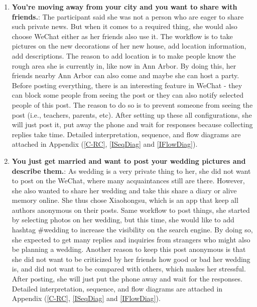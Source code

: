 \documentclass[acmsmall,screen,authorversion,nonacm]{acmart}
\begin{document}
\begin{center}
\begin{enumerate}
    \item \textbf{You’re moving away from your city and you want to share with friends.}: The participant said she was not a person who are eager to share such private news. But when it comes to a required thing, she would also choose WeChat either as her friends also use it. The workflow is to take pictures on the new decorations of her new house, add location information, add descriptions. The reason to add location is to make people know the rough area she is currently in, like now in Ann Arbor. By doing this, her friends nearby Ann Arbor can also come and maybe she can host a party. Before posting everything, there is an interesting feature in WeChat - they can block some people from seeing the post or they can also notify selected people of this post. The reason to do so is to prevent someone from seeing the post (i.e., teachers, parents, etc). After setting up these all configurations, she will just post it, put away the phone and wait for responses because collecting replies take time. Detailed interpretation, sequence, and flow diagrams are attached in Appendix (\ref{C-RC}, \ref{ISeqDiag} and \ref{IFlowDiag}). 

    \item \textbf{You just get married and want to post your wedding pictures and describe them.}: As wedding is a very private thing to her, she did not want to post on the WeChat, where many acquaintances still are there. However, she also wanted to share her wedding and take this share a diary or alive memory online. She thus chose Xiaohongsu, which is an app that keep all authors anonymous on their posts. Same workflow to post things, she started by selecting photos on her wedding, but this time, she would like to add hashtag \#wedding to increase the visibility on the search engine. By doing so, she expected to get many replies and inquiries from strangers who might also be planning a wedding. Another reason to keep this post anonymous is that she did not want to be criticized by her friends how good or bad her wedding is, and did not want to be compared with others, which makes her stressful. After posting, she will just put the phone away and wait for the responses. Detailed interpretation, sequence, and flow diagrams are attached in Appendix (\ref{C-RC}, \ref{ISeqDiag} and \ref{IFlowDiag}). 
\end{enumerate}
\end{center}


\vspace{7pt}
\end{document}
